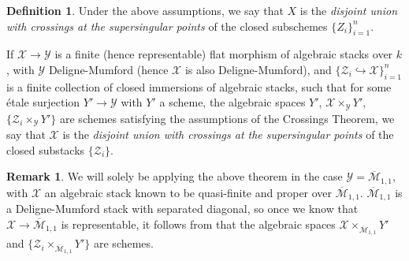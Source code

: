 \documentclass[11pt]{amsart}
\theoremstyle{definition}
\newtheorem{definition}[subsection]{Definition}
\newtheorem{remark}[subsection]{Remark}
\begin{document}
\begin{definition}
Under the above assumptions, we say that $X$ is the \textit{disjoint union with crossings at the supersingular points} of the closed subschemes $\{Z_i\}_{i = 1}^n$. 

If ${\mathcal{X}} \rightarrow {\mathcal{Y}}$ is a finite (hence representable) flat morphism of algebraic stacks over $k$, with ${\mathcal{Y}}$ Deligne-Mumford (hence ${\mathcal{X}}$ is also Deligne-Mumford), and $\{{\mathcal{Z}}_i \hookrightarrow {\mathcal{X}}\}_{i = 1}^n$ is a finite collection of closed immersions of algebraic stacks, such that for some \'etale surjection $Y' \rightarrow {\mathcal{Y}}$ with $Y'$ a scheme, the algebraic spaces $Y'$, ${\mathcal{X}} \times_{\mathcal{Y}} Y'$, $\{{\mathcal{Z}}_i \times_{\mathcal{Y}} Y'\}$ are schemes satisfying the assumptions of the Crossings Theorem, we say that ${\mathcal{X}}$ is the \textit{disjoint union with crossings at the supersingular points} of the closed substacks $\{{\mathcal{Z}}_i\}$.
\end{definition}

\begin{remark}
We will solely be applying the above theorem in the case ${\mathcal{Y}} = \overline{\mathcal{M}}_{1,1}$, with ${\mathcal{X}}$ an algebraic stack known to be quasi-finite and proper over $\overline{\mathcal{M}}_{1,1}$. $\overline{\mathcal{M}}_{1,1}$ is a Deligne-Mumford stack with separated diagonal, so once we know that ${\mathcal{X}} \rightarrow \overline{\mathcal{M}}_{1,1}$ is representable, it follows from \cite[II.6.16]{K} that the algebraic spaces ${\mathcal{X}} \times_{\overline{\mathcal{M}}_{1,1}} Y'$ and $\{{\mathcal{Z}}_i \times_{\overline{\mathcal{M}}_{1,1}} Y'\}$ are schemes.
\end{remark}
\end{document}

